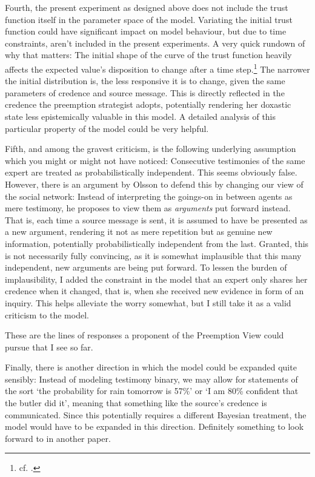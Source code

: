 \documentclass[11pt, a4paper]{scrartcl}
\renewcommand{\i}[1]{\emph{#1}}
\begin{document}
Fourth, the present experiment as designed above does not include the trust function itself in the parameter space of the model. Variating the initial trust function could have significant impact on model behaviour, but due to time constraints, aren't included in the present experiments. A very quick rundown of why that matters: The initial shape of the curve of the trust function heavily affects the expected value's disposition to change after a time step.\footnote{cf. \textcite{Angere2010}.} The narrower the initial distribution is, the less responsive it is to change, given the same parameters of credence and source message. This is directly reflected in the credence the preemption strategist adopts, potentially rendering her doxastic state less epistemically valuable in this model. A detailed analysis of this particular property of the model could be very helpful.

Fifth, and among the gravest criticism, is the following underlying assumption which you might or might not have noticed: Consecutive testimonies of the same expert are treated as probabilistically independent. This seems obviously false. However, there is an argument by \textcite{Olsson2013b} Olsson to defend this by changing our view of the social network: Instead of interpreting the goings-on in between agents as mere testimony, he proposes to view them as \i{arguments} put forward instead. That is, each time a source message is sent, it is assumed to have be presented as a new argument, rendering it not as mere repetition but as genuine new information, potentially probabilistically independent from the last. Granted, this is not necessarily fully convincing, as it is somewhat implausible that this many independent, new arguments are being put forward. To lessen the burden of implausibility, I added the constraint in the model that an expert only shares her credence when it changed, that is, when she received new evidence in form of an inquiry. This helps alleviate the worry somewhat, but I still take it as a valid criticism to the model.

These are the lines of responses a proponent of the Preemption View could pursue that I see so far. 

Finally, there is another direction in which the model could be expanded quite sensibly: Instead of modeling testimony binary, we may allow for statements of the sort `the probability for rain tomorrow is 57\%' or `I am 80\% confident that the butler did it', meaning that something like the source's credence is communicated. Since this potentially requires a different Bayesian treatment, the model would have to be expanded in this direction. Definitely something to look forward to in another paper. 

\printbibliography{}
\end{document}
